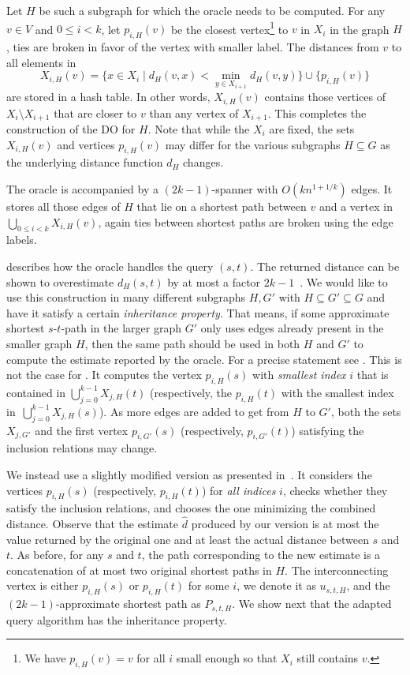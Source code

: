 \documentclass{theoretics}
\renewcommand{\le}{\leqslant}
\begin{document}
Let $H$ be such a subgraph for which the oracle needs to be computed.
For any $v\in V$ and $0\le i<k$, 
let $p_{i,H}(v)$ be the closest vertex\footnote{%
  We have $p_{i,H}(v) = v$  for all $i$ small enough so that $X_{i}$ still contains $v$.
}
to $v$ in $X_i$ in the graph $H$,
ties are broken in favor of the vertex with smaller label.
The distances from $v$ to all elements in
\begin{equation*}
	X_{i,H}(v)=\{x\in X_i \mid d_H(v,x) < \min_{y\in X_{i+1}}d_H(v,y)\} \cup \{p_{i,H}(v)\}
\end{equation*}
are stored in a hash table.
In other words, $X_{i,H}(v)$ contains those vertices of $X_i{\setminus}X_{i+1}$ that are closer to $v$
than any vertex of $X_{i+1}$.
This completes the construction of the DO for $H$.
Note that while the $X_i$ are fixed,
the sets $X_{i,H}(v)$ and vertices $p_{i,H}(v)$ may differ for the various subgraphs $H \subseteq G$
as the underlying distance function $d_H$ changes.

The oracle is accompanied by a $(2k{-}1)$-spanner with $O(k n^{1+1/k})$ edges.
It stores all those edges of $H$ that lie on
a shortest path between $v$ and a vertex in $\bigcup_{0\le i<k}X_{i,H}(v)$,
again ties between shortest paths are broken using the edge labels. 


 describes how the oracle handles the query $(s,t)$.
The returned distance can be shown to overestimate $d_H(s,t)$ by at most a factor $2k{-}1$~\cite[Lemma~3.3]{ThorupZ05}.
We would like to use this construction in many different subgraphs $H,G'$
with $H \subseteq G' \subseteq G$
and have it satisfy a certain \emph{inheritance property}.
That means, if some approximate shortest $s$-$t$-path in the larger graph $G'$
only uses edges already present in the smaller graph $H$,
then the same path should be used in both $H$ and $G'$ 
to compute the estimate reported by the oracle.
For a precise statement see .
This is not the case for .
It computes the vertex $p_{i,H}(s)$ with \emph{smallest index} $i$
that is contained in $\bigcup_{j=0}^{k-1} X_{j,H}(t)$
(respectively, the $p_{i,H}(t)$ with the smallest index in~$\bigcup_{j=0}^{k-1} X_{j,H}(s)$).
As more edges are added to get from $H$ to $G'$,
both the sets $X_{j,G'}$ and the first vertex $p_{i,G'}(s)$ (respectively, $p_{i,G'}(t)$) 
satisfying the inclusion relations may change.

We instead use a slightly modified version as presented in~. 
It considers the vertices $p_{i,H}(s)$ (respectively, $p_{i,H}(t)$) for \emph{all indices} $i$,
checks whether they satisfy the inclusion relations,
and chooses the one minimizing the combined distance.
Observe that the estimate $\widehat{d}$ produced by our version is at most the value returned 
by the original one and at least the actual distance between $s$ and $t$.
As before, for any $s$ and $t$, 
the path corresponding to the new estimate is a concatenation of 
at most two original shortest paths in $H$.
The interconnecting vertex is either $p_{i,H}(s)$ or $p_{i,H}(t)$ for some $i$,
we denote it as $u_{s,t,H}$, and the $(2k{-}1)$-approximate
shortest path as $P_{s,t,H}$.
We show next that the adapted query algorithm has the inheritance property.
\end{document}
